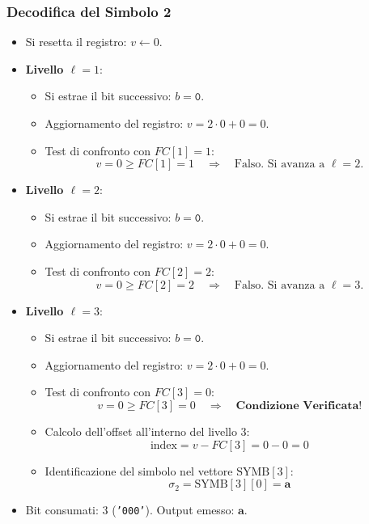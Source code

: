 \subsubsection*{Decodifica del Simbolo 2}
\begin{itemize}
  \item Si resetta il registro: $v \leftarrow 0$.
  \item \textbf{Livello $\ell = 1$}:
  \begin{itemize}
    \item Si estrae il bit successivo: $b = \texttt{0}$.
    \item Aggiornamento del registro: $v = 2 \cdot 0 + 0 = 0$.
    \item Test di confronto con $FC[1] = 1$:
    \begin{equation}
      v = 0 \ge FC[1] = 1 \quad \Longrightarrow \quad \text{Falso. Si avanza a } \ell = 2.
    \end{equation}
  \end{itemize}
  \item \textbf{Livello $\ell = 2$}:
  \begin{itemize}
    \item Si estrae il bit successivo: $b = \texttt{0}$.
    \item Aggiornamento del registro: $v = 2 \cdot 0 + 0 = 0$.
    \item Test di confronto con $FC[2] = 2$:
    \begin{equation}
      v = 0 \ge FC[2] = 2 \quad \Longrightarrow \quad \text{Falso. Si avanza a } \ell = 3.
    \end{equation}
  \end{itemize}
  \item \textbf{Livello $\ell = 3$}:
  \begin{itemize}
    \item Si estrae il bit successivo: $b = \texttt{0}$.
    \item Aggiornamento del registro: $v = 2 \cdot 0 + 0 = 0$.
    \item Test di confronto con $FC[3] = 0$:
    \begin{equation}
      v = 0 \ge FC[3] = 0 \quad \Longrightarrow \quad \textbf{Condizione Verificata!}
    \end{equation}
    \item Calcolo dell'offset all'interno del livello 3:
    \begin{equation}
      \text{index} = v - FC[3] = 0 - 0 = 0
    \end{equation}
    \item Identificazione del simbolo nel vettore $\text{SYMB}[3]$:
    \begin{equation}
      \sigma_2 = \text{SYMB}[3][0] = \mathbf{a}
    \end{equation}
  \end{itemize}
  \item Bit consumati: $3$ (\texttt{'000'}). Output emesso: $\mathbf{a}$.
\end{itemize}

